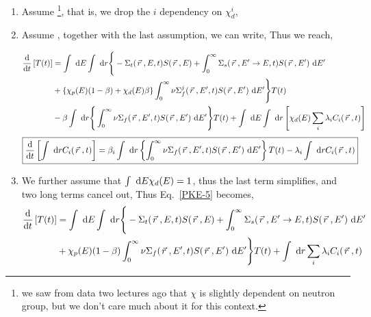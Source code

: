 \documentclass{school-22.211-notes}
\begin{document}
\begin{enumerate}
\item Assume \footnote{we saw from data two lectures ago that $\chi$ is slightly dependent on neutron group, but we don't care much about it for this context.}, that is, we drop the $i$ dependency on $\chi_d^i$, 

\item Assume , together with the last assumption, we can write, 
Thus we reach, 

  \begin{align}
    \frac{\mathrm{d}}{\mathrm{d}t} \left[ T(t) \right] &= 
    \int \mbox{ }\mathrm{d} E \int \mbox{ }\mathrm{d} r \Bigg\{  - \Sigma_t (\left.\vec{r}\right., E, t) S(\left.\vec{r}\right., E)   + \int_0^{\infty} \Sigma_s (\left.\vec{r}\right., E'\to E, t) S(\left.\vec{r}\right., E') \mbox{ }\mathrm{d} E'   \notag \\
    &+ \left\{ \chi_p (E) (1-\beta) + \chi_d (E) \beta \right\} \int_0^{\infty} \nu \Sigma_f^j (\left.\vec{r}\right., E', t) S(\left.\vec{r}\right., E') \mbox{ }\mathrm{d} E'  \Bigg\} T(t)  \notag \\
    &-  \beta \int \mbox{ }\mathrm{d} r \Bigg\{ \int_0^{\infty} \nu \Sigma_f (\left.\vec{r}\right., E', t) S(\left.\vec{r}\right., E') \mbox{ }\mathrm{d} E' \Bigg\} T(t)  
    + \int \mbox{ }\mathrm{d} E \int \mbox{ }\mathrm{d} r \left[ \chi_d (E) \displaystyle\sum_i \lambda_i C_i (\left.\vec{r}\right., t) \right]   \label{PKE-5}
  \end{align}
    \begin{align}
    \Aboxed{ \ddt \left[ \int \dr C_i (\vecr, t) \right] &=  \beta_i \int \dr \left\{ \int_0^{\infty} \nu \Sigma_f (\vecr, E', t) S(\vecr, E') \dE' \right\} T(t)  - \lambda_i \int \dr C_i (\vecr, t)  } \label{PKE-6}
  \end{align}


\item We further assume that $\int \mbox{ }\mathrm{d} E \chi_d (E)  = 1$, thus the last term simplifies, and two long terms cancel out, 
Thus Eq.~\ref{PKE-5} becomes, 
  \begin{align}
    \frac{\mathrm{d}}{\mathrm{d}t} \left[ T(t) \right] &= 
    \int \mbox{ }\mathrm{d} E \int \mbox{ }\mathrm{d} r \Bigg\{  - \Sigma_t (\left.\vec{r}\right., E, t) S(\left.\vec{r}\right., E)   + \int_0^{\infty} \Sigma_s (\left.\vec{r}\right., E'\to E, t) S(\left.\vec{r}\right., E') \mbox{ }\mathrm{d} E'   \notag \\
    &+ \chi_p (E) (1-\beta) \int_0^{\infty} \nu \Sigma_f (\left.\vec{r}\right., E', t) S(\left.\vec{r}\right., E') \mbox{ }\mathrm{d} E'  \Bigg\} T(t)  +  \int \mbox{ }\mathrm{d} r  \displaystyle\sum_i \lambda_i C_i (\left.\vec{r}\right., t)    \label{PKE-7}
  \end{align}



\end{enumerate}
\end{document}
